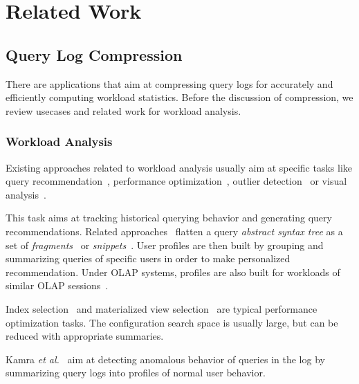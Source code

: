 \chapter{Related Work}
\label{chapter:relatedwork}

\section{Query Log Compression}
There are applications that aim at compressing query logs for accurately and efficiently computing workload statistics.
Before the discussion of compression, we review usecases and related work for workload analysis.

\subsection{Workload Analysis}
Existing approaches related to workload analysis usually aim at specific tasks like query recommendation~\cite{DBLP:conf/icdm/MittalVCEP10,DBLP:journals/jdwm/GiacomettiMNS11,DBLP:journals/pvldb/KhoussainovaKBS11,DBLP:conf/icde/YangPS09,DBLP:journals/kais/AligonGMRT14}, performance optimization~\cite{DBLP:conf/adbis/AouicheJD06,DBLP:conf/sigmod/BrunoCG01}, outlier detection~\cite{DBLP:journals/vldb/KamraTB08} or visual analysis~\cite{DBLP:conf/simbig/MakiyamaRS15}. 

This task aims at tracking historical querying behavior and generating query recommendations.
Related approaches~\cite{DBLP:conf/icdm/MittalVCEP10,DBLP:journals/pvldb/KhoussainovaKBS11} flatten a query \textit{abstract syntax tree} as a set of \textit{fragments}~\cite{DBLP:conf/icdm/MittalVCEP10} or \textit{snippets}~\cite{DBLP:journals/pvldb/KhoussainovaKBS11}.
User profiles are then built by grouping and summarizing queries of specific users in order to make personalized recommendation. 
Under OLAP systems, profiles are also built for workloads of similar OLAP sessions~\cite{DBLP:journals/kais/AligonGMRT14}.

Index selection~\cite{DBLP:conf/vldb/ChaudhuriN97,DBLP:journals/tods/FinkelsteinST88} and materialized view selection~\cite{DBLP:conf/vldb/AgrawalCN00,DBLP:conf/adbis/AouicheJD06,DBLP:conf/sigmod/BrunoCG01} are typical performance optimization tasks.
The configuration search space is usually large, but can be reduced with appropriate summaries.

Kamra \textit{et al.}~\cite{DBLP:journals/vldb/KamraTB08} aim at detecting anomalous behavior of queries in the log by summarizing query logs into profiles
of normal user behavior.

